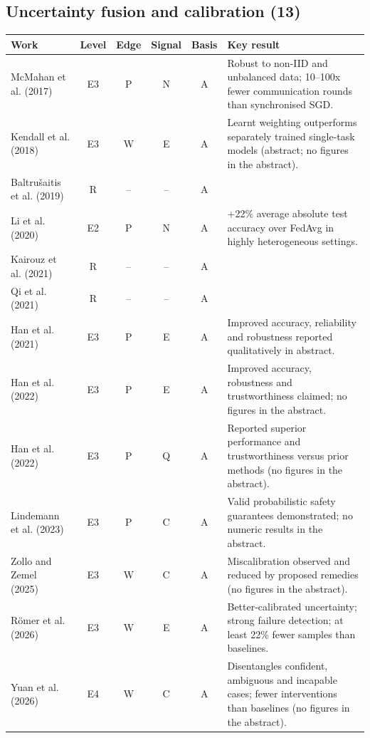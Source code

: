 \documentclass[10pt,a4paper]{article}
\begin{document}
\subsection*{Uncertainty fusion and calibration (13)}
\begin{longtable}{@{}>{\raggedright\arraybackslash}p{4.0cm}cccc>{\raggedright\arraybackslash}p{7.6cm}@{}}
\toprule \textbf{Work} & \textbf{Level} & \textbf{Edge} & \textbf{Signal} & \textbf{Basis} & \textbf{Key result} \\ \midrule \endhead
McMahan et al. (2017)~\cite{McMahan2017} & E3 & P & N & A & Robust to non-IID and unbalanced data; 10--100x fewer communication rounds than synchronised SGD. \\
Kendall et al. (2018)~\cite{Kendall2018} & E3 & W & E & A & Learnt weighting outperforms separately trained single-task models (abstract; no figures in the abstract). \\
Baltrušaitis et al. (2019)~\cite{Baltrusaitis2019} & R & -- & -- & A &  \\
Li et al. (2020)~\cite{Li2020} & E2 & P & N & A & +22\% average absolute test accuracy over FedAvg in highly heterogeneous settings. \\
Kairouz et al. (2021)~\cite{Kairouz2021} & R & -- & -- & A &  \\
Qi et al. (2021)~\cite{Qi2021} & R & -- & -- & A &  \\
Han et al. (2021)~\cite{Han2021} & E3 & P & E & A & Improved accuracy, reliability and robustness reported qualitatively in abstract. \\
Han et al. (2022)~\cite{Han2022a} & E3 & P & E & A & Improved accuracy, robustness and trustworthiness claimed; no figures in the abstract. \\
Han et al. (2022)~\cite{Han2022b} & E3 & P & Q & A & Reported superior performance and trustworthiness versus prior methods (no figures in the abstract). \\
Lindemann et al. (2023)~\cite{Lindemann2023} & E3 & P & C & A & Valid probabilistic safety guarantees demonstrated; no numeric results in the abstract. \\
Zollo and Zemel (2025)~\cite{Zollo2025} & E3 & W & C & A & Miscalibration observed and reduced by proposed remedies (no figures in the abstract). \\
R\"omer et al. (2026)~\cite{Romer2026a} & E3 & W & E & A & Better-calibrated uncertainty; strong failure detection; at least 22\% fewer samples than baselines. \\
Yuan et al. (2026)~\cite{Yuan2026} & E4 & W & C & A & Disentangles confident, ambiguous and incapable cases; fewer interventions than baselines (no figures in the abstract). \\
\bottomrule\end{longtable}
\end{document}
